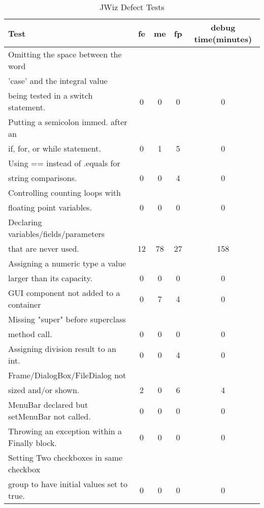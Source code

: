 \begin{table}[htpb]
  \caption{JWiz Defect Tests}
  \begin{center}
  \begin{tabular}{|l|c|c|c|c|}
    \hline Test & fe & me & fp & debug time(minutes) \\ \hline \hline
    Omitting the space between the word & & & & \\
    'case' and the integral value & & & & \\
    being tested in a switch statement. 
    & 0 & 0 & 0 & 0 \\ \hline
    Putting a semicolon immed. after an & & & & \\
    if, for, or while statement.
    & 0 & 1 & 5 & 0 \\ \hline
    Using == instead of .equals for & & & & \\
    string comparisons. 
    & 0 & 0 & 4 & 0 \\ \hline
    Controlling counting loops with & & & & \\
    floating point variables.
    & 0 & 0 & 0 & 0 \\ \hline
    Declaring variables/fields/parameters & & & &\\
    that are never used.
    & 12 & 78 & 27 & 158 \\ \hline
    Assigning a numeric type a value & & & & \\
    larger than its capacity.
    & 0 & 0 & 0 & 0 \\ \hline
    GUI component not added to a container
    & 0 & 7 & 4 & 0 \\ \hline
    Missing "super" before superclass & & & & \\
    method call.
    & 0 & 0 & 0 & 0 \\ \hline
    Assigning division result to an int.
    & 0 & 0 & 4 & 0 \\ \hline
    Frame/DialogBox/FileDialog not & & & & \\
    sized and/or shown.
    & 2 & 0 & 6 & 4 \\ \hline
    MenuBar declared but setMenuBar not called.
    & 0 & 0 & 0 & 0 \\ \hline
    Throwing an exception within a Finally block.
    & 0 & 0 & 0 & 0 \\ \hline
    Setting Two checkboxes in same checkbox & & & & \\
    group to have initial values set to true. 
    & 0 & 0 & 0 & 0 \\ \hline
   \end{tabular}
  \end{center}
 \label{JWiz Defect Tests}
\end{table}

